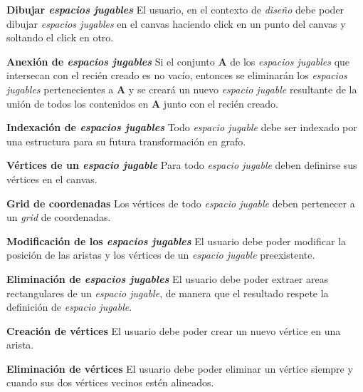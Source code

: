 	\item \textbf{Dibujar \textit{espacios jugables}}\newline
		El usuario, en el contexto de \textit{diseño} debe poder dibujar \textit{espacios jugables} en el canvas haciendo click en un punto del canvas y soltando el click en otro.
		\begin{functional}
			\item \textbf{Anexión de \textit{espacios jugables}}\newline
				Si el conjunto \textbf{A} de los \textit{espacios jugables} que intersecan con el recién creado es no vacío, entonces se eliminarán los \textit{espacios jugables} pertenecientes a \textbf{A} y se creará un nuevo \textit{espacio jugable} resultante de la unión de todos los contenidos en \textbf{A} junto con el recién creado.
			\item \textbf{Indexación de \textit{espacios jugables}}\newline
				Todo \textit{espacio jugable} debe ser indexado por una estructura para su futura transformación en grafo.
			\item \textbf{Vértices de un \textit{espacio jugable}}\newline
				Para todo \textit{espacio jugable} deben definirse sus vértices en el canvas.
			\item \textbf{Grid de coordenadas}
				Los vértices de todo \textit{espacio jugable} deben pertenecer a un \textit{grid} de coordenadas.
		\end{functional}
	\item \textbf{Modificación de los \textit{espacios jugables}}\newline
		El usuario debe poder modificar la posición de las aristas y los vértices de un \textit{espacio jugable} preexistente.
	\item \textbf{Eliminación de \textit{espacios jugables}}\newline
		El usuario debe poder extraer areas rectangulares de un \textit{espacio jugable}, de manera que el resultado respete la definición de \textit{espacio jugable}.
	\item \textbf{Creación de vértices}\newline
		El usuario debe poder crear un nuevo vértice en una arista.
	\item \textbf{Eliminación de vértices}\newline
		El usuario debe poder eliminar un vértice siempre y cuando sus dos vértices vecinos estén alineados.
